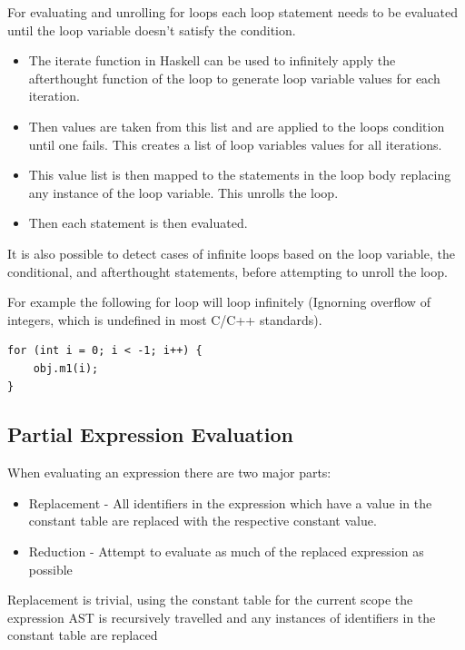 For evaluating and unrolling for loops each loop statement needs to be evaluated
until the loop variable doesn't satisfy the condition. 

\begin{itemize}
\item The iterate function in Haskell can be used to infinitely apply the afterthought function
of the loop to generate loop variable values for each iteration.

\item Then values are taken from this list and are applied to the loops condition until
one fails. This creates a list of loop variables values for all iterations. 

\item This value list is then mapped to the statements in the loop body replacing any instance
of the loop variable. This unrolls the loop.

\item Then each statement is then evaluated. 
\end{itemize}


It is also possible to detect cases of infinite loops based on the loop variable, 
the conditional, and afterthought statements, before attempting to unroll the loop.

For example the following for loop will loop infinitely (Ignorning overflow of integers, which is undefined in most C/C++ standards).
\begin{lstlisting}[style=myGPC]
for (int i = 0; i < -1; i++) {
    obj.m1(i);
}
\end{lstlisting}


\subsection{Partial Expression Evaluation}
When evaluating an expression there are two major parts:

\begin{itemize}
    \item Replacement - All identifiers in the expression which have a value in the constant table are
          replaced with the respective constant value.

    \item Reduction - Attempt to evaluate as much of the replaced expression as possible

\end{itemize}

Replacement is trivial, using the constant table for the current scope the
expression AST is recursively travelled and any instances of identifiers
in the constant table are replaced



